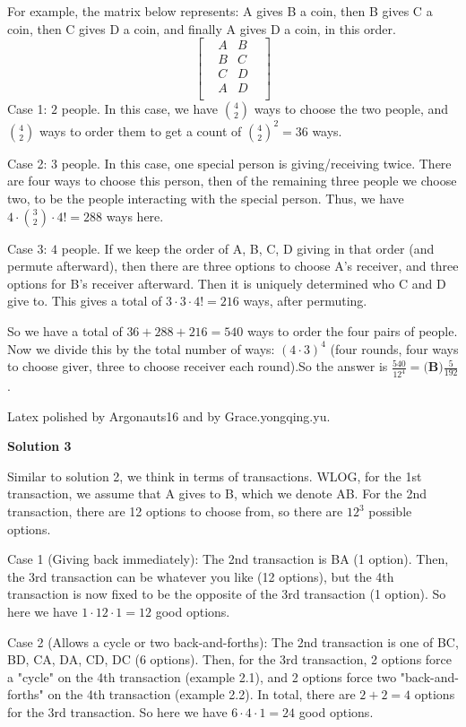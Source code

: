 \begin{enumerate}
 For example, the matrix below represents: A gives B a coin, then B gives C a coin, then C gives D a coin, and finally A gives D a coin, in this order. 
 \[ \begin{bmatrix} & A & B & \\ & B & C & \\ & C & D & \\ & A & D & \\ \end{bmatrix} \]Case 1: $2$ people. In this case, we have $\binom{4}{2}$ ways to choose the two people, and $\binom{4}{2}$ ways to order them to get a count of ${\binom{4}{2}}^2 = 36$ ways.

 Case 2: $3$ people. In this case, one special person is giving/receiving twice. There are four ways to choose this person, then of the remaining three people we choose two, to be the people interacting with the special person. Thus, we have $4\cdot\binom{3}{2}\cdot4! = 288$ ways here.

 Case 3: $4$ people. If we keep the order of A, B, C, D giving in that order (and permute afterward), then there are three options to choose A's receiver, and three options for B's receiver afterward. Then it is uniquely determined who C and D give to. This gives a total of $3\cdot3\cdot4! = 216$ ways, after permuting.

 
So we have a total of $36+288+216=540$ ways to order the four pairs of people. Now we divide this by the total number of ways: $(4\cdot3)^4$ (four rounds, four ways to choose giver, three to choose receiver each round).So the answer is $\frac{540}{12^4} = \boxed{\textbf{(B)}\frac{5}{192}}$.

 Latex polished by Argonauts16 and by Grace.yongqing.yu.

 



\textbf{Solution 3}

Similar to solution 2, we think in terms of transactions. WLOG, for the 1st transaction, we assume that A gives to B, which we denote AB. For the 2nd transaction, there are 12 options to choose from, so there are $12^3$ possible options.

 Case 1 (Giving back immediately): The 2nd transaction is BA (1 option). Then, the 3rd transaction can be whatever you like (12 options), but the 4th transaction is now fixed to be the opposite of the 3rd transaction (1 option). So here we have $1\cdot 12\cdot 1 = 12$ good options.

 Case 2 (Allows a cycle or two back-and-forths): The 2nd transaction is one of BC, BD, CA, DA, CD, DC (6 options). Then, for the 3rd transaction, 2 options force a "cycle" on the 4th transaction (example 2.1), and 2 options force two "back-and-forths" on the 4th transaction (example 2.2). In total, there are $2+2=4$ options for the 3rd transaction. So here we have $6\cdot 4\cdot 1 = 24$ good options. 


\end{enumerate}
